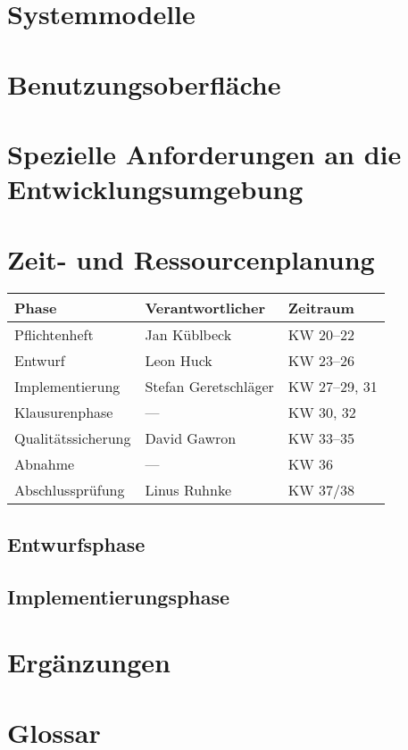 \documentclass[parskip=full]{scrartcl}
\begin{document}
\section{Systemmodelle}

\section{Benutzungsoberfläche}

\section{Spezielle Anforderungen an die Entwicklungsumgebung}

\section{Zeit- und Ressourcenplanung}

\begin{tabular}{| l | l | l |}
	\hline
	\textbf{Phase} & \textbf{Verantwortlicher} & \textbf{Zeitraum} \\ \hline
	Pflichtenheft & Jan Küblbeck & KW 20–22 \\
	Entwurf & Leon Huck & KW 23–26 \\
	Implementierung & Stefan Geretschläger & KW 27–29, 31 \\
	Klausurenphase & — & KW 30, 32 \\
	Qualitätssicherung & David Gawron & KW 33–35 \\
	Abnahme & — & KW 36 \\
	Abschlussprüfung & Linus Ruhnke & KW 37/38 \\
	\hline
\end{tabular}

\subsection{Entwurfsphase}

\subsection{Implementierungsphase}

\section{Ergänzungen}

\section{Glossar}

\renewcommand*{\glossarysection}[2][]{}	%
\printnoidxglossaries				%
\end{document}
